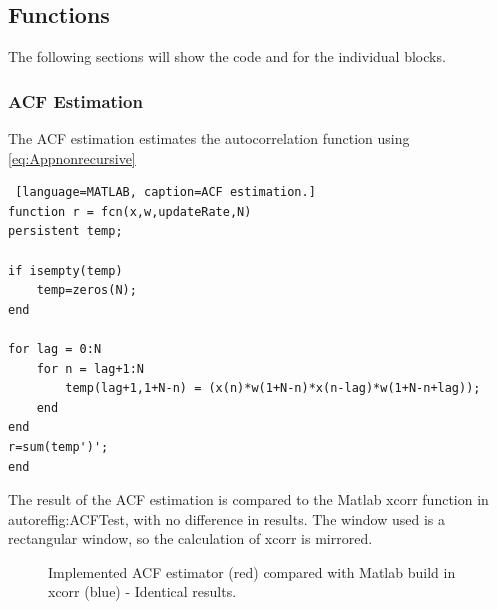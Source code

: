 \subsection{Functions}
The following sections will show the code and for the individual blocks. 



\subsubsection{ACF Estimation}
The ACF estimation estimates the autocorrelation function using \autoref{eq:Appnonrecursive}
\begin{lstlisting} [language=MATLAB, caption=ACF estimation.]
function r = fcn(x,w,updateRate,N)
persistent temp;

if isempty(temp)
	temp=zeros(N);
end

for lag = 0:N
	for n = lag+1:N
		temp(lag+1,1+N-n) = (x(n)*w(1+N-n)*x(n-lag)*w(1+N-n+lag));
	end
end
r=sum(temp')';
end
\end{lstlisting}

The result of the ACF estimation is compared to the Matlab xcorr function in autoref{fig:ACFTest}, with no difference in results. The window used is a rectangular window, so the calculation of xcorr is mirrored.  
\begin{figure}[H]
	\centering
	
	\caption{Implemented ACF estimator (red) compared with Matlab build in xcorr (blue) - Identical results.}
	\label{fig:ACFTest}
\end{figure}
 

